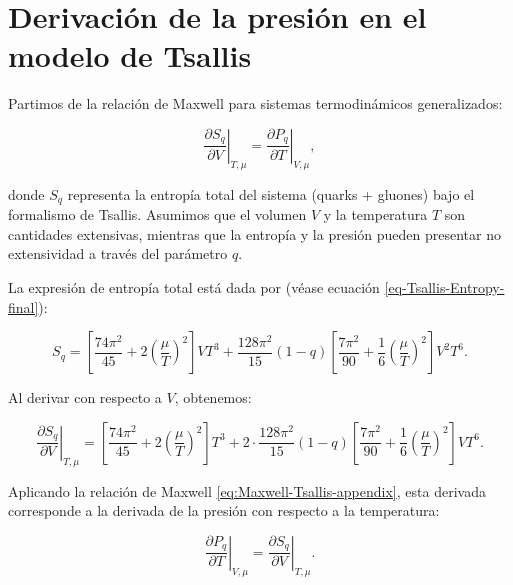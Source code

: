 
\section{Derivación de la presión en el modelo de Tsallis}
\label{app:Tsallis-pressure}

Partimos de la relación de Maxwell para sistemas termodinámicos generalizados:

\begin{equation}\label{eq:Maxwell-Tsallis-appendix}
\left. \frac{\partial S_q}{\partial V} \right|_{T,\mu} = \left. \frac{\partial P_q}{\partial T} \right|_{V,\mu},
\end{equation}

donde \( S_q \) representa la entropía total del sistema (quarks + gluones) bajo el formalismo de Tsallis. Asumimos que el volumen \( V \) y la temperatura \( T \) son cantidades extensivas, mientras que la entropía y la presión pueden presentar no extensividad a través del parámetro \( q \).

La expresión de entropía total está dada por (véase ecuación \ref{eq-Tsallis-Entropy-final}):

\begin{equation}
S_q = \left[ \frac{74\pi^2}{45} + 2\left( \frac{\mu}{T} \right)^2 \right] V T^3 + \frac{128\pi^2}{15}(1-q)\left[ \frac{7\pi^2}{90} + \frac{1}{6} \left( \frac{\mu}{T} \right)^2 \right] V^2 T^6.
\end{equation}

Al derivar con respecto a \( V \), obtenemos:

\begin{equation}\label{eq:dSdV}
\left. \frac{\partial S_q}{\partial V} \right|_{T,\mu} = \left[ \frac{74\pi^2}{45} + 2\left( \frac{\mu}{T} \right)^2 \right] T^3 + 2 \cdot \frac{128\pi^2}{15}(1-q)\left[ \frac{7\pi^2}{90} + \frac{1}{6} \left( \frac{\mu}{T} \right)^2 \right] V T^6.
\end{equation}

Aplicando la relación de Maxwell \eqref{eq:Maxwell-Tsallis-appendix}, esta derivada corresponde a la derivada de la presión con respecto a la temperatura:

\begin{equation}
\left. \frac{\partial P_q}{\partial T} \right|_{V,\mu} = \left. \frac{\partial S_q}{\partial V} \right|_{T,\mu}.
\end{equation}

